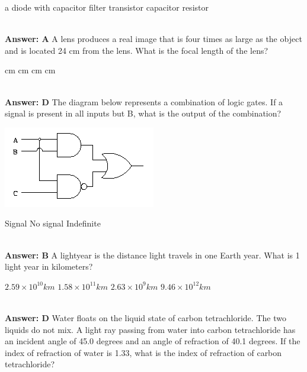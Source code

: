 \documentclass[12pt,addpoints]{exam}
\begin{document}
{{{\begin{questions}
\begin{oneparchoices}
						\choice a diode with capacitor filter
						\choice transistor
						\choice capacitor
						\choice resistor
					\end{oneparchoices}
					\\ \textbf{Answer: A}
					\question A lens produces a real image that is four times as large as the object and is located 24 cm from the lens. What is the focal length of the lens? \\
					\begin{oneparchoices}
						 cm
						 cm
						 cm
						 cm
					\end{oneparchoices}
					\\ \textbf{Answer: D}
					\question The diagram below represents a combination of logic gates. If a signal is present in all inputs but B, what is the output of the combination? \\
					\begin{center}
						\includegraphics[scale=0.6]{gate}
					\end{center}
					\begin{oneparchoices}
						\choice Signal
						\choice No signal
						\choice Indefinite
					\end{oneparchoices}
					\\ \textbf{Answer: B}
					\question A lightyear is the distance light travels in one Earth year. What is 1 light year in kilometers? \\
					\begin{oneparchoices}
						\choice $2.59 \times 10^{10} km$
						\choice $1.58 \times 10^{11} km$
						\choice $2.63 \times 10^{9} km$
						\choice $9.46 \times 10^{12} km$
					\end{oneparchoices}
					\\ \textbf{Answer: D}
					\question Water floats on the liquid state of carbon tetrachloride. The two liquids do not mix. A light ray passing from water into carbon tetrachloride has an incident angle of 45.0 degrees and an angle of refraction of 40.1 degrees. If the index of refraction of water is 1.33, what is the index of refraction of carbon tetrachloride?\\

\end{questions}}}}
\end{document}
